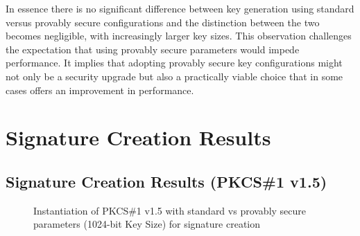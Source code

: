\documentclass[]{final_report}
\theoremstyle{definition}
\begin{document}
In essence there is no significant difference between key generation using standard versus provably secure configurations and the distinction between the two becomes negligible, with increasingly larger key sizes. This observation challenges the expectation that using provably secure parameters would impede performance. It implies that adopting provably secure key configurations might not only be a security upgrade but also a practically viable choice that in some cases offers an improvement in performance.


\section{Signature Creation Results}
\subsection{Signature Creation Results (PKCS\#1 v1.5)}

\begin{figure}[H]
    \centering %
     \caption{Instantiation of PKCS\#1 v1.5 with standard vs provably secure parameters (1024-bit Key Size) for signature creation}
    \begin{minipage}{\textwidth}
        \centering
    \end{minipage}
            \label{pkcs_sign_1024bit_table}
  \end{figure}
  
\end{document}
